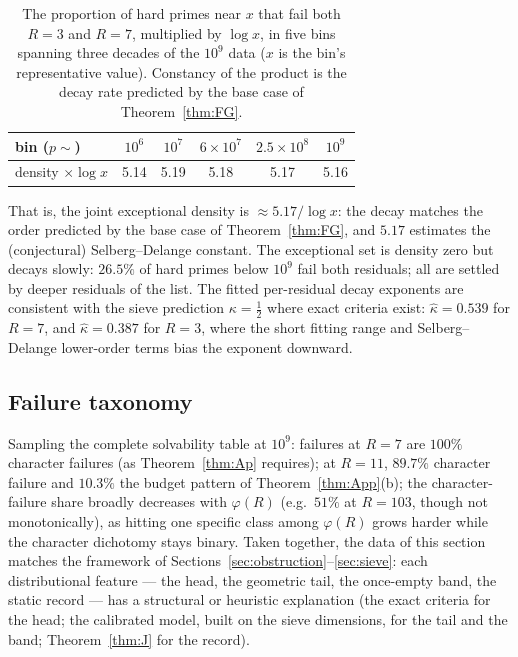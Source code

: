 \documentclass[11pt]{article}
\theoremstyle{plain}
\theoremstyle{remark}
\theoremstyle{plain}
\numberwithin{equation}{section}
\begin{document}
\begin{table}[htbp]
\centering
\begin{tabular}{lccccc}
\toprule
bin ($p \sim$) & $10^6$ & $10^7$ & $6 \times 10^7$ & $2.5 \times 10^8$ & $10^9$ \\ \midrule
density $\times \log x$ & 5.14 & 5.19 & 5.18 & 5.17 & 5.16 \\
\bottomrule
\end{tabular}
\caption{The proportion of hard primes near $x$ that fail both
$R = 3$ and $R = 7$, multiplied by $\log x$, in five bins spanning three decades
of the $10^9$ data ($x$ is the bin's representative value). Constancy of the product is the decay
rate predicted by the base case of Theorem~\ref{thm:FG}.}
\label{tab:calib}
\end{table}

That is, the joint exceptional density is $\approx 5.17 / \log x$:
the decay matches the order predicted by the base case of
Theorem~\ref{thm:FG}, and $5.17$
estimates the (conjectural) Selberg--Delange constant. The exceptional
set is density zero but decays slowly: $26.5\%$ of hard primes below
$10^9$ fail both residuals; all are settled by deeper residuals of the
list. The fitted per-residual decay exponents are consistent with the
sieve prediction $\kappa = \tfrac12$ where exact criteria exist:
$\hat\kappa = 0.539$ for $R = 7$, and $\hat\kappa = 0.387$ for
$R = 3$, where the short fitting range and Selberg--Delange lower-order
terms bias the exponent downward.

\subsection{Failure taxonomy}

Sampling the complete solvability table at $10^9$: failures at $R = 7$
are $100\%$ character failures (as Theorem~\ref{thm:Ap} requires); at $R = 11$,
$89.7\%$ character failure and $10.3\%$ the budget pattern of
Theorem~\ref{thm:App}(b); the character-failure share broadly decreases with
$\varphi(R)$ (e.g.\ $51\%$ at $R = 103$, though not monotonically), as
hitting one specific class among
$\varphi(R)$ grows harder while the character dichotomy stays binary.
Taken together, the data of this section matches the framework of
Sections~\ref{sec:obstruction}--\ref{sec:sieve}: each distributional
feature --- the head, the geometric tail, the once-empty band, the
static record --- has a structural or heuristic explanation (the exact
criteria for the head; the calibrated model, built on the sieve
dimensions, for the tail and the band; Theorem~\ref{thm:J} for the
record).
\end{document}
